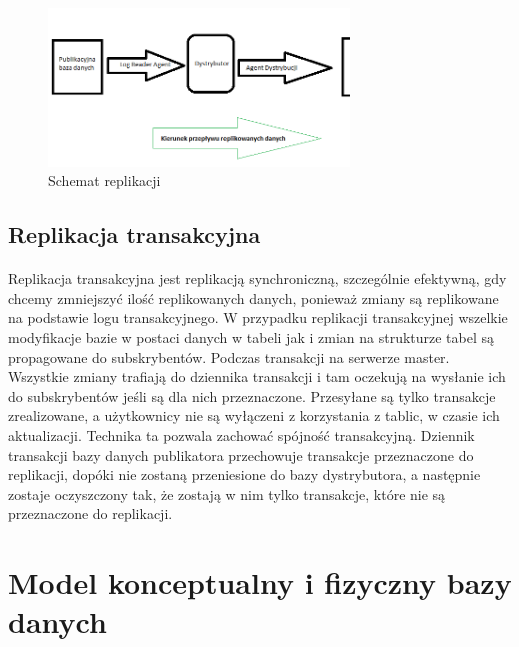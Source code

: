 \documentclass{article}
\begin{document}
	\begin{figure}[hbt!]
		\includegraphics[width=8cm]{Files/Pictures/ReplikacjaArchitektura}
		\centering
		\caption{Schemat replikacji}
	\end{figure}

	\subsection{Replikacja transakcyjna}
	\paragraph{} Replikacja transakcyjna jest replikacją synchroniczną, szczególnie efektywną, gdy chcemy zmniejszyć ilość replikowanych danych, ponieważ zmiany są replikowane na podstawie logu transakcyjnego. W przypadku replikacji transakcyjnej wszelkie modyfikacje bazie w postaci danych w tabeli jak i zmian na strukturze tabel są propagowane do subskrybentów. Podczas transakcji na serwerze master. Wszystkie zmiany trafiają do dziennika transakcji i tam oczekują na wysłanie ich do subskrybentów jeśli są dla nich przeznaczone. Przesyłane są tylko transakcje zrealizowane, a użytkownicy nie są wyłączeni z korzystania z tablic, w czasie ich aktualizacji. Technika ta pozwala zachować spójność transakcyjną. Dziennik transakcji bazy danych publikatora przechowuje transakcje przeznaczone do replikacji, dopóki nie zostaną przeniesione do bazy dystrybutora, a następnie zostaje oczyszczony tak, że zostają w nim tylko transakcje, które nie są przeznaczone do replikacji.
	

\section{Model konceptualny i fizyczny bazy danych}
\end{document}
